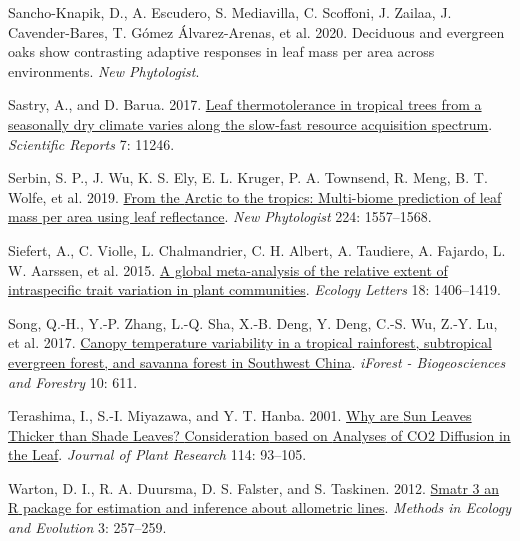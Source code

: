 \documentclass[
  12pt,
  a4paper,
,tablecaptionabove
]{scrartcl}
\newlength{\cslhangindent}
\newenvironment{CSLReferences}[2] %
 {%
  \setlength{\parindent}{0pt}
  \ifodd #1 \everypar{\setlength{\hangindent}{\cslhangindent}}\ignorespaces\fi
  \ifnum #2 > 0
  \setlength{\parskip}{#2\baselineskip}
  \fi
 }%
 {}
\begin{document}
\begin{CSLReferences}{1}{0}
\leavevmode{}%
Sancho-Knapik, D., A. Escudero, S. Mediavilla, C. Scoffoni, J. Zailaa, J. Cavender-Bares, T. Gómez Álvarez-Arenas, et al. 2020. Deciduous and evergreen oaks show contrasting adaptive responses in leaf mass per area across environments. \emph{New Phytologist}.

\leavevmode{}%
Sastry, A., and D. Barua. 2017. \href{https://doi.org/10.1038/s41598-017-11343-5}{Leaf thermotolerance in tropical trees from a seasonally dry climate varies along the slow-fast resource acquisition spectrum}. \emph{Scientific Reports} 7: 11246.

\leavevmode{}%
Serbin, S. P., J. Wu, K. S. Ely, E. L. Kruger, P. A. Townsend, R. Meng, B. T. Wolfe, et al. 2019. \href{https://doi.org/10.1111/nph.16123}{From the {Arctic} to the tropics: Multi-biome prediction of leaf mass per area using leaf reflectance}. \emph{New Phytologist} 224: 1557--1568.

\leavevmode{}%
Siefert, A., C. Violle, L. Chalmandrier, C. H. Albert, A. Taudiere, A. Fajardo, L. W. Aarssen, et al. 2015. \href{https://doi.org/10.1111/ele.12508}{A global meta-analysis of the relative extent of intraspecific trait variation in plant communities}. \emph{Ecology Letters} 18: 1406--1419.

\leavevmode{}%
Song, Q.-H., Y.-P. Zhang, L.-Q. Sha, X.-B. Deng, Y. Deng, C.-S. Wu, Z.-Y. Lu, et al. 2017. \href{https://doi.org/10.3832/ifor2223-010}{Canopy temperature variability in a tropical rainforest, subtropical evergreen forest, and savanna forest in {Southwest China}}. \emph{iForest - Biogeosciences and Forestry} 10: 611.

\leavevmode{}%
Terashima, I., S.-I. Miyazawa, and Y. T. Hanba. 2001. \href{https://doi.org/10.1007/PL00013972}{Why are {Sun Leaves Thicker} than {Shade Leaves}? \textemdash{} {Consideration} based on {Analyses} of {CO2 Diffusion} in the {Leaf}}. \emph{Journal of Plant Research} 114: 93--105.

\leavevmode{}%
Warton, D. I., R. A. Duursma, D. S. Falster, and S. Taskinen. 2012. \href{https://doi.org/10.1111/j.2041-210X.2011.00153.x}{Smatr 3\textendash{} an {R} package for estimation and inference about allometric lines}. \emph{Methods in Ecology and Evolution} 3: 257--259.


\end{CSLReferences}
\end{document}
